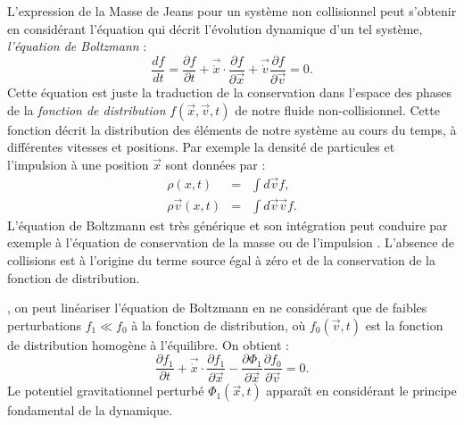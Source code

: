 L'expression de la Masse de Jeans pour un système non collisionnel peut s'obtenir en considérant l'équation qui décrit l'évolution dynamique d'un tel système, \textit{l'équation de Boltzmann} :
\begin{equation}
\frac{d f}{dt}=\frac{\partial f}{\partial t}+\vec{\dot x}\cdot\frac{\partial f}{\partial \vec{x}}+\vec{\dot v}\frac{\partial f}{\partial \vec{v}}=0.
\end{equation}
Cette équation est juste la traduction de la conservation dans l'espace des phases de la \textit{fonction de distribution} $f(\vec{x},\vec{v},t)$ de notre fluide non-collisionnel. Cette fonction décrit la distribution des éléments de notre système au cours du temps, à différentes vitesses et positions. Par exemple la densité de particules  et l'impulsion à une position $\vec{x}$ sont données par :
\begin{eqnarray}
\rho(x,t)&=&\int d\vec{v} f,\\
\rho \vec{v}(x,t)&=&\int d\vec{v}\vec{v} f.
\end{eqnarray}
L'équation de Boltzmann est très générique et son intégration peut conduire par exemple à l'équation de conservation de la masse ou de l'impulsion . L'absence de collisions est à l'origine du terme source égal à zéro et de la conservation de la fonction de distribution.

, on peut linéariser l'équation de Boltzmann en ne considérant que de faibles perturbations $f_1\ll f_0$ à la fonction de distribution, où $f_0(\vec{v},t)$ est la fonction de distribution homogène à l'équilibre. On obtient :
\begin{equation}
\frac{\partial f_1}{\partial t}+\vec{\dot x}\cdot\frac{\partial f_1}{\partial \vec{x}}-\frac{\partial \Phi_1}{\partial \vec{x}}\frac{\partial f_0}{\partial \vec{v}}=0.
\end{equation}
Le potentiel gravitationnel perturbé $\Phi_1(\vec{x},t)$ apparaît en considérant le principe fondamental de la dynamique.


